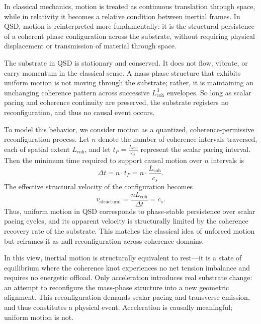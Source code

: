 \documentclass[entropy,article,submit,pdftex,moreauthors]{Definitions/mdpi}
\begin{document}
In classical mechanics, motion is treated as continuous translation through space, while in relativity it becomes a relative condition between inertial frames. In QSD, motion is reinterpreted more fundamentally: it is the structural persistence of a coherent phase configuration across the substrate, without requiring physical displacement or transmission of material through space.

The substrate in QSD is stationary and conserved. It does not flow, vibrate, or carry momentum in the classical sense. A mass-phase structure that exhibits uniform motion is not moving through the substrate; rather, it is maintaining an unchanging coherence pattern across successive \texorpdfstring{\( L_{\text{coh}}^3 \)}{Lcoh\^{}3} envelopes. So long as scalar pacing and coherence continuity are preserved, the substrate registers no reconfiguration, and thus no causal event occurs.

To model this behavior, we consider motion as a quantized, coherence-permissive reconfiguration process. Let \( n \) denote the number of coherence intervals traversed, each of spatial extent \( L_{\text{coh}} \), and let \( t_P = \frac{L_{\text{coh}}}{c_s} \) represent the scalar pacing interval. Then the minimum time required to support causal motion over \( n \) intervals is
\[
\Delta t = n \cdot t_P = n \cdot \frac{L_{\text{coh}}}{c_s}.
\]
The effective structural velocity of the configuration becomes
\[
v_{\text{structural}} = \frac{n L_{\text{coh}}}{\Delta t} = c_s.
\]
Thus, uniform motion in QSD corresponds to phase-stable persistence over scalar pacing cycles, and its apparent velocity is structurally limited by the coherence recovery rate of the substrate. This matches the classical idea of unforced motion but reframes it as null reconfiguration across coherence domains.

In this view, inertial motion is structurally equivalent to rest—it is a state of equilibrium where the coherence knot experiences no net tension imbalance and requires no energetic offload. Only acceleration introduces real substrate change: an attempt to reconfigure the mass-phase structure into a new geometric alignment. This reconfiguration demands scalar pacing and transverse emission, and thus constitutes a physical event. Acceleration is causally meaningful; uniform motion is not.
\end{document}
